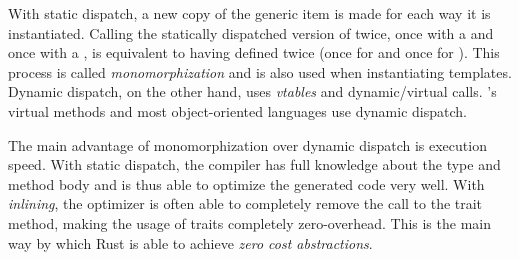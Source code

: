 With static dispatch, a new copy of the generic item is made for each way it is instantiated.
Calling the statically dispatched version of  twice, once with a  and once with a , is equivalent to having defined  twice (once for  and once for ).
This process is called \emph{monomorphization} and is also used when instantiating \cpp templates.
Dynamic dispatch, on the other hand, uses \emph{vtables} and dynamic/virtual calls.
\cpp's virtual methods and most object-oriented languages use dynamic dispatch.

The main advantage of monomorphization over dynamic dispatch is execution speed.
With static dispatch, the compiler has full knowledge about the type and method body and is thus able to optimize the generated code very well.
With \emph{inlining}, the optimizer is often able to completely remove the call to the trait method, making the usage of traits completely zero-overhead.
This is the main way by which Rust is able to achieve \emph{zero cost abstractions}.

